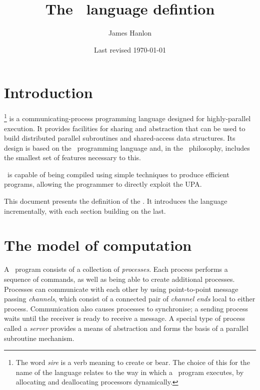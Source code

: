\documentclass[11pt,a4paper,parskip=half-]{scrartcl}
\title{The \sire\ language defintion}
\author{James Hanlon}
\date{Last revised \today}
\begin{document}
\maketitle

\setcounter{tocdepth}{2}
\tableofcontents

\clearpage\section{Introduction}

\def\sirewordfootnote{The word \emph{sire} is a verb meaning to create or bear.
The choice of this for the name of the language relates to the way in which a
\sire\ program executes, by allocating and deallocating processors dynamically.}

\emph{\Sire}\footnote{\sirewordfootnote} is a communicating-process programming
language designed for highly-parallel execution.
%
It provides facilities for sharing and abstraction that can be used to
build distributed parallel subroutines and shared-access data structures.
%
Its design is based on the \occam\ programming language and, in the \occam\
philosophy, includes the smallest set of features necessary to this.

\Sire\ is capable of being compiled using simple techniques to produce
efficient programs, allowing the programmer to directly exploit the UPA.

This document presents the definition of the \sire. It introduces the
language incrementally, with each section building on the last.
 

\section{The model of computation}

A \sire\ program consists of a collection of \emph{processes}. Each process
performs a sequence of commands, as well as being able to create additional
processes.
%
Processes can communicate with each other by using point-to-point message
passing \emph{channels}, which consist of a connected pair of \emph{channel
ends} local to either process. Communication also causes processes
to synchronise; a sending process waits until the receiver is ready to receive
a message.
%
A special type of process called a \emph{server} provides a means of
abstraction and forms the basis of a parallel subroutine mechanism.
\end{document}
